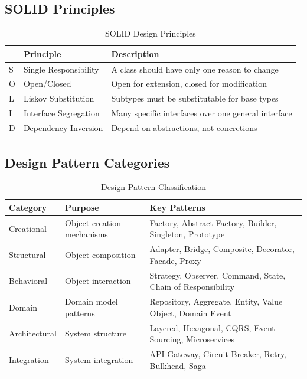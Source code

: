 \documentclass[11pt,letterpaper]{article}
\begin{document}
\subsection{SOLID Principles}

\begin{table}[H]
\centering
\caption{SOLID Design Principles}
\small
\begin{tabular}{@{}L{1cm}L{3.5cm}L{8cm}@{}}
\toprule
\textbf{} & \textbf{Principle} & \textbf{Description} \\
\midrule
S & Single Responsibility & A class should have only one reason to change \\
\addlinespace
O & Open/Closed & Open for extension, closed for modification \\
\addlinespace
L & Liskov Substitution & Subtypes must be substitutable for base types \\
\addlinespace
I & Interface Segregation & Many specific interfaces over one general interface \\
\addlinespace
D & Dependency Inversion & Depend on abstractions, not concretions \\
\bottomrule
\end{tabular}
\end{table}

\subsection{Design Pattern Categories}

\begin{table}[H]
\centering
\caption{Design Pattern Classification}
\small
\begin{tabular}{@{}L{2.5cm}L{4.5cm}L{5.5cm}@{}}
\toprule
\textbf{Category} & \textbf{Purpose} & \textbf{Key Patterns} \\
\midrule
Creational & Object creation mechanisms & Factory, Abstract Factory, Builder, Singleton, Prototype \\
\addlinespace
Structural & Object composition & Adapter, Bridge, Composite, Decorator, Facade, Proxy \\
\addlinespace
Behavioral & Object interaction & Strategy, Observer, Command, State, Chain of Responsibility \\
\addlinespace
Domain & Domain model patterns & Repository, Aggregate, Entity, Value Object, Domain Event \\
\addlinespace
Architectural & System structure & Layered, Hexagonal, CQRS, Event Sourcing, Microservices \\
\addlinespace
Integration & System integration & API Gateway, Circuit Breaker, Retry, Bulkhead, Saga \\
\bottomrule
\end{tabular}
\end{table}
\end{document}
